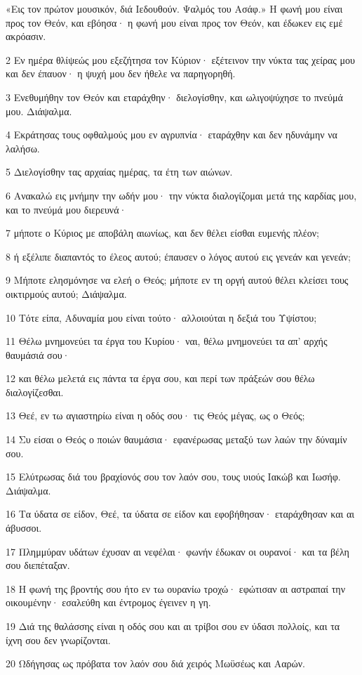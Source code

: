 \par «Εις τον πρώτον μουσικόν, διά Ιεδουθούν. Ψαλμός του Ασάφ.» Η φωνή μου είναι προς τον Θεόν, και εβόησα· η φωνή μου είναι προς τον Θεόν, και έδωκεν εις εμέ ακρόασιν.
\par 2 Εν ημέρα θλίψεώς μου εξεζήτησα τον Κύριον· εξέτεινον την νύκτα τας χείρας μου και δεν έπαυον· η ψυχή μου δεν ήθελε να παρηγορηθή.
\par 3 Ενεθυμήθην τον Θεόν και εταράχθην· διελογίσθην, και ωλιγοψύχησε το πνεύμά μου. Διάψαλμα.
\par 4 Εκράτησας τους οφθαλμούς μου εν αγρυπνία· εταράχθην και δεν ηδυνάμην να λαλήσω.
\par 5 Διελογίσθην τας αρχαίας ημέρας, τα έτη των αιώνων.
\par 6 Ανακαλώ εις μνήμην την ωδήν μου· την νύκτα διαλογίζομαι μετά της καρδίας μου, και το πνεύμά μου διερευνά·
\par 7 μήποτε ο Κύριος με αποβάλη αιωνίως, και δεν θέλει είσθαι ευμενής πλέον;
\par 8 ή εξέλιπε διαπαντός το έλεος αυτού; έπαυσεν ο λόγος αυτού εις γενεάν και γενεάν;
\par 9 Μήποτε ελησμόνησε να ελεή ο Θεός; μήποτε εν τη οργή αυτού θέλει κλείσει τους οικτιρμούς αυτού; Διάψαλμα.
\par 10 Τότε είπα, Αδυναμία μου είναι τούτο· αλλοιούται η δεξιά του Υψίστου;
\par 11 Θέλω μνημονεύει τα έργα του Κυρίου· ναι, θέλω μνημονεύει τα απ' αρχής θαυμάσιά σου·
\par 12 και θέλω μελετά εις πάντα τα έργα σου, και περί των πράξεών σου θέλω διαλογίζεσθαι.
\par 13 Θεέ, εν τω αγιαστηρίω είναι η οδός σου· τις Θεός μέγας, ως ο Θεός;
\par 14 Συ είσαι ο Θεός ο ποιών θαυμάσια· εφανέρωσας μεταξύ των λαών την δύναμίν σου.
\par 15 Ελύτρωσας διά του βραχίονός σου τον λαόν σου, τους υιούς Ιακώβ και Ιωσήφ. Διάψαλμα.
\par 16 Τα ύδατα σε είδον, Θεέ, τα ύδατα σε είδον και εφοβήθησαν· εταράχθησαν και αι άβυσσοι.
\par 17 Πλημμύραν υδάτων έχυσαν αι νεφέλαι· φωνήν έδωκαν οι ουρανοί· και τα βέλη σου διεπέταξαν.
\par 18 Η φωνή της βροντής σου ήτο εν τω ουρανίω τροχώ· εφώτισαν αι αστραπαί την οικουμένην· εσαλεύθη και έντρομος έγεινεν η γη.
\par 19 Διά της θαλάσσης είναι η οδός σου και αι τρίβοι σου εν ύδασι πολλοίς, και τα ίχνη σου δεν γνωρίζονται.
\par 20 Ωδήγησας ως πρόβατα τον λαόν σου διά χειρός Μωϋσέως και Ααρών.

